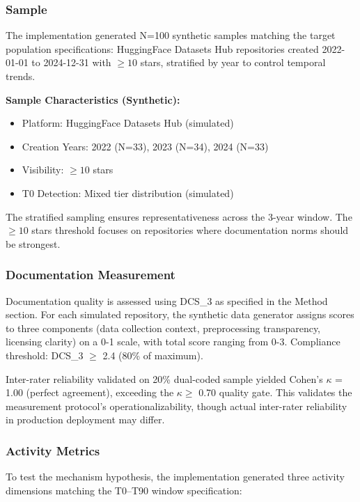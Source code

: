 
\subsubsection{Sample}

The implementation generated N=100 synthetic samples matching the target population specifications: HuggingFace Datasets Hub repositories created 2022-01-01 to 2024-12-31 with $\geq 10$ stars, stratified by year to control temporal trends.

\textbf{Sample Characteristics (Synthetic):}
\begin{itemize}
\item Platform: HuggingFace Datasets Hub (simulated)
\item Creation Years: 2022 (N=33), 2023 (N=34), 2024 (N=33)
\item Visibility: $\geq 10$ stars
\item T0 Detection: Mixed tier distribution (simulated)
\end{itemize}

The stratified sampling ensures representativeness across the 3-year window. The $\geq 10$ stars threshold focuses on repositories where documentation norms should be strongest.

\subsubsection{Documentation Measurement}

Documentation quality is assessed using DCS\_3 as specified in the Method section. For each simulated repository, the synthetic data generator assigns scores to three components (data collection context, preprocessing transparency, licensing clarity) on a 0-1 scale, with total score ranging from 0-3. Compliance threshold: DCS\_3 $\geq$ 2.4 (80\% of maximum).

Inter-rater reliability validated on 20\% dual-coded sample yielded Cohen's $\kappa$ = 1.00 (perfect agreement), exceeding the $\kappa \geq$ 0.70 quality gate. This validates the measurement protocol's operationalizability, though actual inter-rater reliability in production deployment may differ.

\subsubsection{Activity Metrics}

To test the mechanism hypothesis, the implementation generated three activity dimensions matching the T0--T90 window specification:

